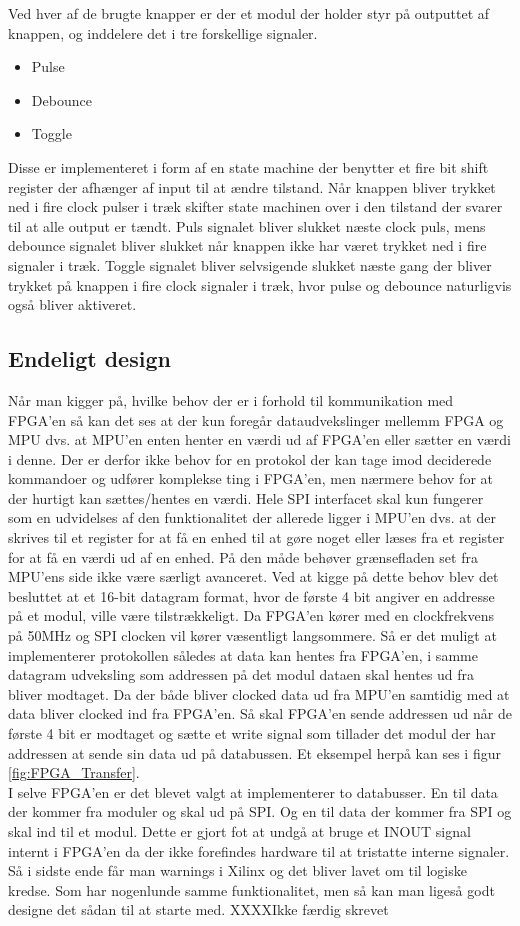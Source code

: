 Ved hver af de brugte knapper er der et modul der holder styr på outputtet af knappen, og inddelere det i tre forskellige signaler.

\begin{itemize}
\item Pulse
\item Debounce
\item Toggle
\end{itemize}

Disse er implementeret i form af en state machine der benytter et fire bit shift register der afhænger af input til at ændre tilstand. Når knappen bliver trykket ned i fire clock pulser i træk skifter state machinen over i den tilstand der svarer til at alle output er tændt. Puls signalet bliver slukket næste clock puls, mens debounce signalet bliver slukket når knappen ikke har været trykket ned i fire signaler i træk. Toggle signalet bliver selvsigende slukket næste gang der bliver trykket på knappen i fire clock signaler i træk, hvor pulse og debounce naturligvis også bliver aktiveret.

\subsection{Endeligt design}
Når man kigger på, hvilke behov der er i forhold til kommunikation med FPGA'en så kan det ses at der kun foregår dataudvekslinger mellemm FPGA og MPU dvs. at MPU'en enten henter en værdi ud af FPGA'en eller sætter en værdi i denne. Der er derfor ikke behov for en protokol der kan tage imod deciderede kommandoer og udfører komplekse ting i FPGA'en, men nærmere behov for at der hurtigt kan sættes/hentes en værdi. Hele SPI interfacet skal kun fungerer som en udvidelses af den funktionalitet der allerede ligger i MPU'en dvs. at der skrives til et register for at få en enhed til at gøre noget eller læses fra et register for at få en værdi ud af en enhed. På den måde behøver grænsefladen set fra MPU'ens side ikke være særligt avanceret. Ved at kigge på dette behov blev det besluttet at et 16-bit datagram format, hvor de første 4 bit angiver en addresse på et modul, ville være tilstrækkeligt. Da FPGA'en kører med en clockfrekvens på 50MHz og SPI clocken vil kører væsentligt langsommere. Så er det muligt at implementerer protokollen således at data kan hentes fra FPGA'en, i samme datagram udveksling som addressen på det modul dataen skal hentes ud fra bliver modtaget. Da der både bliver clocked data ud fra MPU'en samtidig med at data bliver clocked ind fra FPGA'en. Så skal FPGA'en sende addressen ud når de første 4 bit er modtaget og sætte et write signal som tillader det modul der har addressen at sende sin data ud på databussen. Et eksempel herpå kan ses i figur \ref{fig:FPGA_Transfer}.\\
I selve FPGA'en er det blevet valgt at implementerer to databusser. En til data der kommer fra moduler og skal ud på SPI. Og en til data der kommer fra SPI og skal ind til et modul. Dette er gjort fot at undgå at bruge et INOUT signal internt i FPGA'en da der ikke forefindes hardware til at tristatte interne signaler. Så i sidste ende får man warnings i Xilinx og det bliver lavet om til logiske kredse. Som har nogenlunde samme funktionalitet, men så kan man ligeså godt designe det sådan til at starte med. XXXXIkke færdig skrevet